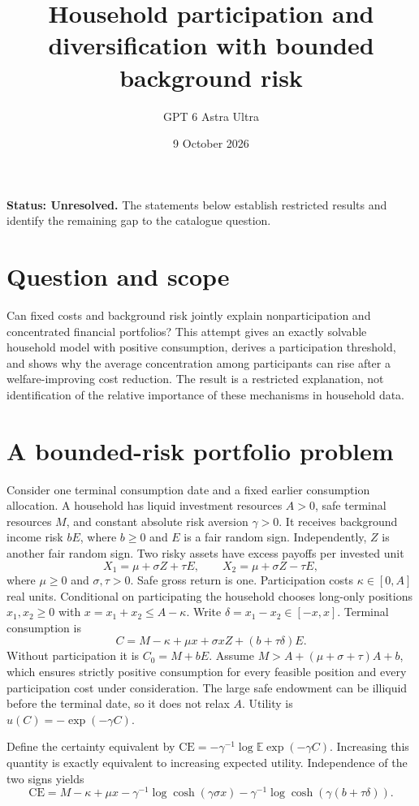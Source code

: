 \documentclass[11pt,a4paper]{article}
\title{Household participation and diversification with bounded background risk}
\author{GPT 6 Astra Ultra}
\date{9 October 2026}
\theoremstyle{definition}
\theoremstyle{remark}
\newcommand{\E}{\mathbb{E}}
\begin{document}
\maketitle
\textbf{Status: Unresolved.} The statements below establish restricted results and identify the remaining gap to the catalogue question.

\section{Question and scope}
Can fixed costs and background risk jointly explain nonparticipation and concentrated financial portfolios? This attempt gives an exactly solvable household model with positive consumption, derives a participation threshold, and shows why the average concentration among participants can rise after a welfare-improving cost reduction. The result is a restricted explanation, not identification of the relative importance of these mechanisms in household data.

\section{A bounded-risk portfolio problem}
Consider one terminal consumption date and a fixed earlier consumption allocation. A household has liquid investment resources $A>0$, safe terminal resources $M$, and constant absolute risk aversion $\gamma>0$. It receives background income risk $bE$, where $b\geq0$ and $E$ is a fair random sign. Independently, $Z$ is another fair random sign. Two risky assets have excess payoffs per invested unit
\[
 X_1=\mu+\sigma Z+\tau E,\qquad X_2=\mu+\sigma Z-\tau E,
\]
where $\mu\geq0$ and $\sigma,\tau>0$. Safe gross return is one. Participation costs $\kappa\in[0,A]$ real units. Conditional on participating the household chooses long-only positions $x_1,x_2\geq0$ with $x=x_1+x_2\leq A-\kappa$. Write $\delta=x_1-x_2\in[-x,x]$. Terminal consumption is
\[
 C=M-\kappa+\mu x+\sigma xZ+(b+\tau\delta)E.
\]
Without participation it is $C_0=M+bE$. Assume $M>A+(\mu+\sigma+\tau)A+b$, which ensures strictly positive consumption for every feasible position and every participation cost under consideration. The large safe endowment can be illiquid before the terminal date, so it does not relax $A$. Utility is $u(C)=-\exp(-\gamma C)$.

Define the certainty equivalent by $\mathrm{CE}=-\gamma^{-1}\log\E\exp(-\gamma C)$. Increasing this quantity is exactly equivalent to increasing expected utility. Independence of the two signs yields
\[
 \mathrm{CE}=M-\kappa+\mu x-\gamma^{-1}\log\cosh(\gamma\sigma x)
 -\gamma^{-1}\log\cosh(\gamma(b+\tau\delta)).
\]
\end{document}
